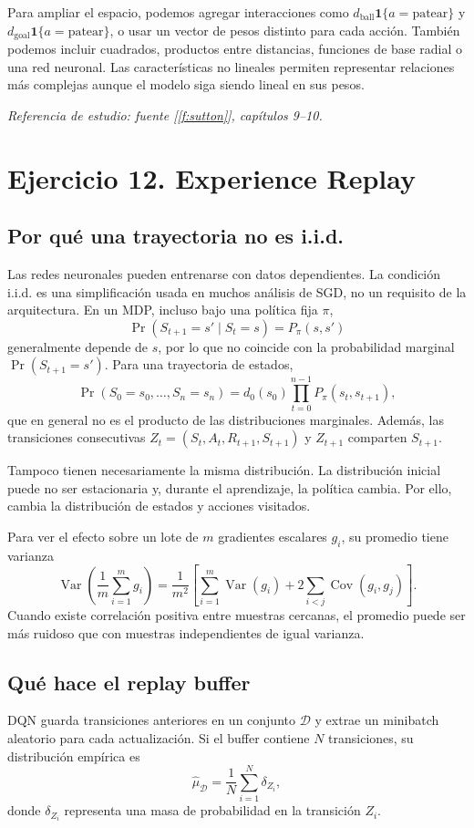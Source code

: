 \documentclass[11pt,a4paper]{article}
\newcommand{\indic}{\mathbf{1}}
\newcommand{\apartado}[1]{\subsection*{#1}}
\begin{document}
Para ampliar el espacio, podemos agregar interacciones como $d_{\mathrm{ball}}\indic\{a=\text{patear}\}$ y $d_{\mathrm{goal}}\indic\{a=\text{patear}\}$, o usar un vector de pesos distinto para cada acción. También podemos incluir cuadrados, productos entre distancias, funciones de base radial o una red neuronal. Las características no lineales permiten representar relaciones más complejas aunque el modelo siga siendo lineal en sus pesos.

\textit{Referencia de estudio: fuente [\ref{f:sutton}], capítulos 9--10.}

\section{Ejercicio 12. Experience Replay}

\apartado{Por qué una trayectoria no es i.i.d.}
Las redes neuronales pueden entrenarse con datos dependientes. La condición i.i.d. es una simplificación usada en muchos análisis de SGD, no un requisito de la arquitectura. En un MDP, incluso bajo una política fija $\pi$,
\[
\Pr(S_{t+1}=s'\mid S_t=s)=P_\pi(s,s')
\]
generalmente depende de $s$, por lo que no coincide con la probabilidad marginal $\Pr(S_{t+1}=s')$. Para una trayectoria de estados,
\[
\Pr(S_0=s_0,\ldots,S_n=s_n)
=d_0(s_0)\prod_{t=0}^{n-1}P_\pi(s_t,s_{t+1}),
\]
que en general no es el producto de las distribuciones marginales. Además, las transiciones consecutivas $Z_t=(S_t,A_t,R_{t+1},S_{t+1})$ y $Z_{t+1}$ comparten $S_{t+1}$.

Tampoco tienen necesariamente la misma distribución. La distribución inicial puede no ser estacionaria y, durante el aprendizaje, la política cambia. Por ello, cambia la distribución de estados y acciones visitados.

Para ver el efecto sobre un lote de $m$ gradientes escalares $g_i$, su promedio tiene varianza
\[
\operatorname{Var}\left(\frac1m\sum_{i=1}^m g_i\right)
=\frac1{m^2}\left[\sum_{i=1}^m\operatorname{Var}(g_i)
+2\sum_{i<j}\operatorname{Cov}(g_i,g_j)\right].
\]
Cuando existe correlación positiva entre muestras cercanas, el promedio puede ser más ruidoso que con muestras independientes de igual varianza.

\apartado{Qué hace el replay buffer}
DQN guarda transiciones anteriores en un conjunto $\mathcal D$ y extrae un minibatch aleatorio para cada actualización. Si el buffer contiene $N$ transiciones, su distribución empírica es
\[
\widehat\mu_{\mathcal D}=\frac1N\sum_{i=1}^N\delta_{Z_i},
\]
donde $\delta_{Z_i}$ representa una masa de probabilidad en la transición $Z_i$.
\end{document}
